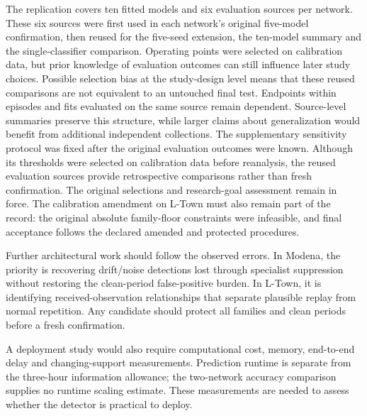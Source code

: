 The replication covers ten fitted models and six evaluation sources per network. These six sources were first used in each network's original five-model confirmation, then reused for the five-seed extension, the ten-model summary and the single-classifier comparison. Operating points were selected on calibration data, but prior knowledge of evaluation outcomes can still influence later study choices. Possible selection bias at the study-design level means that these reused comparisons are not equivalent to an untouched final test. Endpoints within episodes and fits evaluated on the same source remain dependent. Source-level summaries preserve this structure, while larger claims about generalization would benefit from additional independent collections. The supplementary sensitivity protocol was fixed after the original evaluation outcomes were known. Although its thresholds were selected on calibration data before reanalysis, the reused evaluation sources provide retrospective comparisons rather than fresh confirmation. The original selections and research-goal assessment remain in force. The calibration amendment on L-Town must also remain part of the record: the original absolute family-floor constraints were infeasible, and final acceptance follows the declared amended and protected procedures.

Further architectural work should follow the observed errors. In Modena, the priority is recovering drift/noise detections lost through specialist suppression without restoring the clean-period false-positive burden. In L-Town, it is identifying received-observation relationships that separate plausible replay from normal repetition. Any candidate should protect all families and clean periods before a fresh confirmation.

A deployment study would also require computational cost, memory, end-to-end delay and changing-support measurements. Prediction runtime is separate from the three-hour information allowance; the two-network accuracy comparison supplies no runtime scaling estimate. These measurements are needed to assess whether the detector is practical to deploy.
